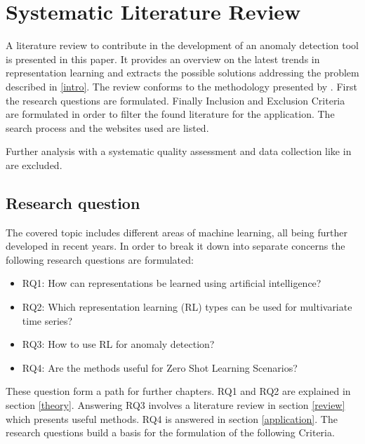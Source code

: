 \section{Systematic Literature Review}\label{methods}
A literature review to contribute in the development of an anomaly detection tool is presented in this paper. It provides an overview on the latest trends in representation learning and extracts the possible solutions addressing the problem described in \ref{intro}. The review conforms to the methodology presented by \cite{kitchenham_systematic_2009}. First the research questions are formulated. Finally Inclusion and Exclusion Criteria are formulated in order to filter the found literature for the application. The search process and the websites used are listed.

Further analysis with a systematic quality assessment and data collection like in \cite{kitchenham_systematic_2009} are excluded.
\subsection{Research question}
The covered topic includes different areas of machine learning, all being further developed in recent years.
In order to break it down into separate concerns the following research questions are formulated:
\begin{itemize}
  \item RQ1: How can representations be learned using artificial intelligence?
  \item RQ2: Which representation learning (RL) types can be used for multivariate time series?
  \item RQ3: How to use RL for anomaly detection?
  \item RQ4: Are the methods useful for Zero Shot Learning Scenarios?
\end{itemize}
These question form a path for further chapters. RQ1 and RQ2 are explained in section \ref{theory}. Answering RQ3 involves a literature review in section \ref{review} which presents useful methods. RQ4 is answered in section \ref{application}. The research questions build a basis for the formulation of the following Criteria.
